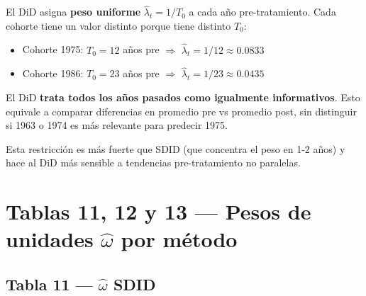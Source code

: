 \documentclass[11pt, a4paper]{article}
\begin{document}
El DiD asigna \textbf{peso uniforme} $\hat{\lambda}_t = 1/T_0$ a cada año
pre-tratamiento. Cada cohorte tiene un valor distinto porque tiene distinto $T_0$:

\begin{itemize}
  \item Cohorte 1975: $T_0=12$ años pre $\Rightarrow$ $\hat{\lambda}_t = 1/12 \approx 0.0833$
  \item Cohorte 1986: $T_0=23$ años pre $\Rightarrow$ $\hat{\lambda}_t = 1/23 \approx 0.0435$
\end{itemize}

\begin{interpretacion}
El DiD \textbf{trata todos los años pasados como igualmente informativos}.
Esto equivale a comparar diferencias en promedio pre vs promedio post,
sin distinguir si 1963 o 1974 es más relevante para predecir 1975.

Esta restricción es más fuerte que SDID (que concentra el peso en 1-2 años)
y hace al DiD más sensible a tendencias pre-tratamiento no paralelas.
\end{interpretacion}

\newpage
\section{Tablas 11, 12 y 13 — Pesos de unidades $\hat{\omega}$ por método}

\subsection{Tabla 11 — $\hat{\omega}$ SDID}
\end{document}
